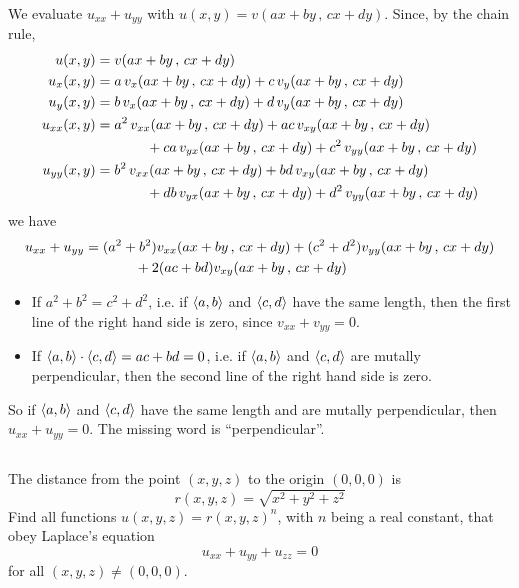 \begin{solution}
We evaluate $u_{xx}+u_{yy}$ with $u(x,y)=v(ax+by\,,\,cx+dy)$.
Since, by the chain rule,
\begin{align*}
u(x,y) &=  v(ax+by\,,\,cx+dy)\\
u_x(x,y) &=  a\,v_x(ax+by\,,\,cx+dy)+c\,v_y(ax+by\,,\,cx+dy) \\
u_y(x,y) &=  b\,v_x(ax+by\,,\,cx+dy)+d\,v_y(ax+by\,,\,cx+dy) \\
u_{xx}(x,y) &=  a^2\,v_{xx}(ax+by\,,\,cx+dy)+ ac\,v_{xy}(ax+by\,,\,cx+dy) \\
            &\hskip0.5in + ca\,v_{yx}(ax+by\,,\,cx+dy)
                +c^2\,v_{yy}(ax+by\,,\,cx+dy) \\
u_{yy}(x,y) &=  b^2\,v_{xx}(ax+by\,,\,cx+dy)+ bd\,v_{xy}(ax+by\,,\,cx+dy) \\
            &\hskip0.5in + db\,v_{yx}(ax+by\,,\,cx+dy)
                +d^2\,v_{yy}(ax+by\,,\,cx+dy)
\end{align*}
we have
\begin{align*}
u_{xx}+u_{yy}
&=(a^2+b^2) v_{xx}(ax+by\,,\,cx+dy)
  +(c^2+d^2) v_{yy}(ax+by\,,\,cx+dy) \\&\hskip0.5in
  +2(ac+bd) v_{xy}(ax+by\,,\,cx+dy)
\end{align*}
\begin{itemize}
\item 
If $a^2+b^2=c^2+d^2$, i.e. if $\left< a,b\right>$ and $\left< c,d\right>$ have the same length, then the first line of the right hand side is zero, 
since $v_{xx}+v_{yy}=0$. 
\item 
If $\left< a,b\right>\cdot\left< c,d\right>=ac+bd=0$, 
i.e. if  $\left< a,b\right>$ and $\left< c,d\right>$ are mutally perpendicular, then the
second line of the right hand side is zero. 
\end{itemize}
So if $\left< a,b\right>$ and $\left< c,d\right>$ have the same length and are  mutally perpendicular, then $u_{xx}+u_{yy}=0$. The missing word is ``perpendicular''.
\end{solution}



\subsection*{\Application}

\begin{question}
The distance from the point $(x,y,z)$ to the origin $(0,0,0)$ is 
\begin{equation*}
r(x,y,z) = \sqrt{x^2+y^2+z^2}
\end{equation*}
Find all functions $u(x,y,z) = r(x,y,z)^n$, with $n$ being a real constant, that obey Laplace's equation
\begin{equation*}
u_{xx}+u_{yy}+u_{zz}=0
\end{equation*}
for all $(x,y,z)\ne  (0,0,0)$.
\end{question}

